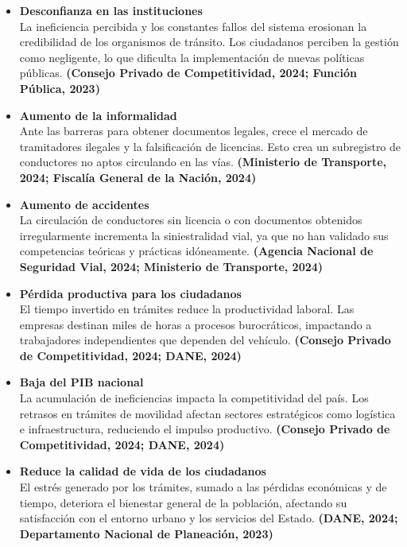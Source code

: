 \begin{itemize}
\item \textbf{Desconfianza en las instituciones} \\
La ineficiencia percibida y los constantes fallos del sistema erosionan la credibilidad de los organismos de tránsito. Los ciudadanos perciben la gestión como negligente, lo que dificulta la implementación de nuevas políticas públicas.  
\textbf{(Consejo Privado de Competitividad, 2024; Función Pública, 2023)}

\item \textbf{Aumento de la informalidad} \\
Ante las barreras para obtener documentos legales, crece el mercado de tramitadores ilegales y la falsificación de licencias. Esto crea un subregistro de conductores no aptos circulando en las vías.  
\textbf{(Ministerio de Transporte, 2024; Fiscalía General de la Nación, 2024)}

\item \textbf{Aumento de accidentes} \\
La circulación de conductores sin licencia o con documentos obtenidos irregularmente incrementa la siniestralidad vial, ya que no han validado sus competencias teóricas y prácticas idóneamente.  
\textbf{(Agencia Nacional de Seguridad Vial, 2024; Ministerio de Transporte, 2024)}

\item \textbf{Pérdida productiva para los ciudadanos} \\
El tiempo invertido en trámites reduce la productividad laboral. Las empresas destinan miles de horas a procesos burocráticos, impactando a trabajadores independientes que dependen del vehículo.  
\textbf{(Consejo Privado de Competitividad, 2024; DANE, 2024)}

\item \textbf{Baja del PIB nacional} \\
La acumulación de ineficiencias impacta la competitividad del país. Los retrasos en trámites de movilidad afectan sectores estratégicos como logística e infraestructura, reduciendo el impulso productivo.  
\textbf{(Consejo Privado de Competitividad, 2024; DANE, 2024)}

\item \textbf{Reduce la calidad de vida de los ciudadanos} \\
El estrés generado por los trámites, sumado a las pérdidas económicas y de tiempo, deteriora el bienestar general de la población, afectando su satisfacción con el entorno urbano y los servicios del Estado.  
\textbf{(DANE, 2024; Departamento Nacional de Planeación, 2023)}


\end{itemize}

